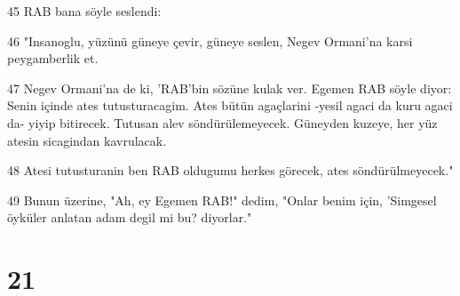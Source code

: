 \par 45 RAB bana söyle seslendi:
\par 46 "Insanoglu, yüzünü güneye çevir, güneye seslen, Negev Ormani'na karsi peygamberlik et.
\par 47 Negev Ormani'na de ki, 'RAB'bin sözüne kulak ver. Egemen RAB söyle diyor: Senin içinde ates tutusturacagim. Ates bütün agaçlarini -yesil agaci da kuru agaci da- yiyip bitirecek. Tutusan alev söndürülemeyecek. Güneyden kuzeye, her yüz atesin sicagindan kavrulacak.
\par 48 Atesi tutusturanin ben RAB oldugumu herkes görecek, ates söndürülmeyecek."
\par 49 Bunun üzerine, "Ah, ey Egemen RAB!" dedim, "Onlar benim için, 'Simgesel öyküler anlatan adam degil mi bu? diyorlar."

\chapter{21}

